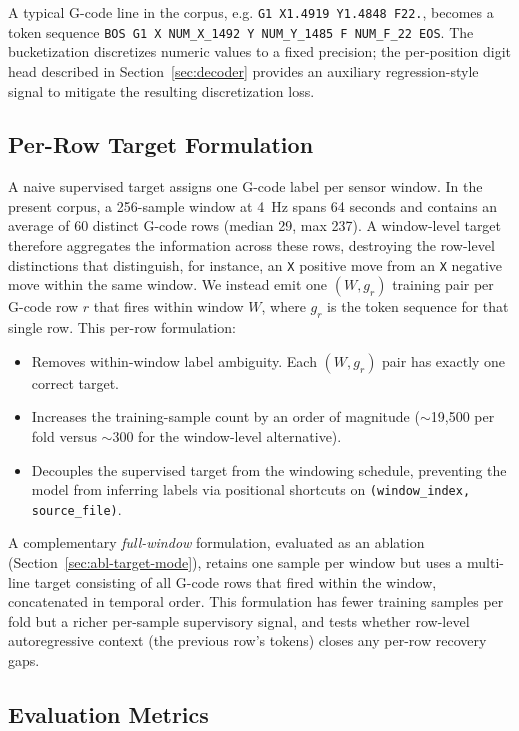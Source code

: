 \documentclass[sensors,article,submit,moreauthors,pdftex]{Definitions/mdpi}
\begin{document}
A typical G-code line in the corpus, e.g. \texttt{G1 X1.4919 Y1.4848 F22.}, becomes a token sequence \texttt{BOS G1 X NUM\_X\_1492 Y NUM\_Y\_1485 F NUM\_F\_22 EOS}. The bucketization discretizes numeric values to a fixed precision; the per-position digit head described in Section~\ref{sec:decoder} provides an auxiliary regression-style signal to mitigate the resulting discretization loss.

\subsection{Per-Row Target Formulation}
\label{sec:per-row}

A naive supervised target assigns one G-code label per sensor window. In the present corpus, a 256-sample window at 4~Hz spans 64 seconds and contains an average of 60 distinct G-code rows (median 29, max 237). A window-level target therefore aggregates the information across these rows, destroying the row-level distinctions that distinguish, for instance, an \texttt{X} positive move from an \texttt{X} negative move within the same window. We instead emit one $(W, g_r)$ training pair per G-code row $r$ that fires within window $W$, where $g_r$ is the token sequence for that single row. This per-row formulation:

\begin{itemize}
\item Removes within-window label ambiguity. Each $(W, g_r)$ pair has exactly one correct target.
\item Increases the training-sample count by an order of magnitude ($\sim$19{,}500 per fold versus $\sim$300 for the window-level alternative).
\item Decouples the supervised target from the windowing schedule, preventing the model from inferring labels via positional shortcuts on \texttt{(window\_index, source\_file)}.
\end{itemize}

A complementary \emph{full-window} formulation, evaluated as an ablation (Section~\ref{sec:abl-target-mode}), retains one sample per window but uses a multi-line target consisting of all G-code rows that fired within the window, concatenated in temporal order. This formulation has fewer training samples per fold but a richer per-sample supervisory signal, and tests whether row-level autoregressive context (the previous row's tokens) closes any per-row recovery gaps.

\subsection{Evaluation Metrics}
\label{sec:metrics}
\end{document}
